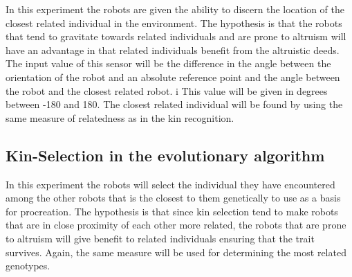 \documentclass[a4paper]{book}
\begin{document}
In this experiment the robots are given the ability to discern the location of the closest related individual in the environment. 
The hypothesis is that the robots that tend to gravitate towards related individuals and are prone to altruism will have an advantage in that related individuals benefit from the altruistic deeds.  
The input value of this sensor will be the difference in the angle between the orientation of the robot and an absolute reference point and the angle between the robot and the closest related robot. i
This value will be given in degrees between -180 and 180.
The closest related individual will be found by using the same measure of relatedness as in the kin recognition.

\subsection{Kin-Selection in the evolutionary algorithm}

In this experiment the robots will select the individual they have encountered among the other robots that is the closest to them genetically to use as a basis for procreation. 
The hypothesis is that since kin selection tend to make robots that are in close proximity of each other more related, the robots that are prone to altruism will give benefit to related 
individuals ensuring that the trait survives. Again, the same measure will be used for determining the most related genotypes.
 

\end{document}
